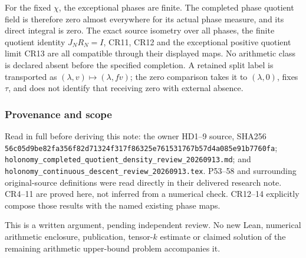 For the fixed \(\chi\), the exceptional phases are finite. The completed phase quotient field is therefore zero almost everywhere for its actual phase measure, and its direct integral is zero. The exact source isometry over all phases, the finite quotient identity \(J_NR_N=I\), CR11, CR12 and the exceptional positive quotient limit CR13 are all compatible through their displayed maps. No arithmetic class is declared absent before the specified completion. A retained split label is transported as \((\lambda,v)\mapsto(\lambda,fv)\); the zero comparison takes it to \((\lambda,0)\), fixes \(\tau\), and does not identify that receiving zero with external absence.

\subsubsection{Provenance and scope}\label{provenance-and-scope}

\begingroup\raggedright
Read in full before deriving this note: the owner HD1--9 source, SHA256 \nolinkurl{56c05d9be82fa356f82d71324f317f86325e761531767b57d4a085e91b7760fa}; \nolinkurl{holonomy_completed_quotient_density_review_20260913.md}; and \nolinkurl{holonomy_continuous_descent_review_20260913.tex}. P53--58 and surrounding original-source definitions were read directly in their delivered research note. CR4--11 are proved here, not inferred from a numerical check. CR12--14 explicitly compose those results with the named existing phase maps.

\par\endgroup

This is a written argument, pending independent review. No new Lean, numerical arithmetic enclosure, publication, tensor-\(k\) estimate or claimed solution of the remaining arithmetic upper-bound problem accompanies it.


\endgroup
